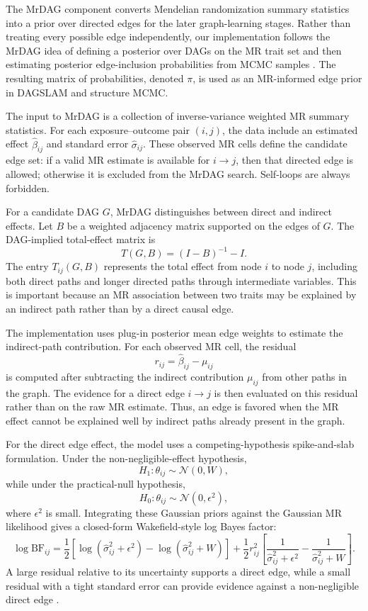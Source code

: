 \documentclass[11pt]{article}
\begin{document}
The MrDAG component converts Mendelian randomization summary statistics into a prior over directed edges for the later graph-learning stages. Rather than treating every possible edge independently, our implementation follows the MrDAG idea of defining a posterior over DAGs on the MR trait set and then estimating posterior edge-inclusion probabilities from MCMC samples \citep{Zuber2025}. The resulting matrix of probabilities, denoted $\pi$, is used as an MR-informed edge prior in DAGSLAM and structure MCMC.

The input to MrDAG is a collection of inverse-variance weighted MR summary statistics. For each exposure--outcome pair $(i,j)$, the data include an estimated effect $\hat{\beta}_{ij}$ and standard error $\hat{\sigma}_{ij}$. These observed MR cells define the candidate edge set: if a valid MR estimate is available for $i \to j$, then that directed edge is allowed; otherwise it is excluded from the MrDAG search. Self-loops are always forbidden.

For a candidate DAG $G$, MrDAG distinguishes between direct and indirect effects. Let $B$ be a weighted adjacency matrix supported on the edges of $G$. The DAG-implied total-effect matrix is
\[
T(G,B) = (I - B)^{-1} - I.
\]
The entry $T_{ij}(G,B)$ represents the total effect from node $i$ to node $j$, including both direct paths and longer directed paths through intermediate variables. This is important because an MR association between two traits may be explained by an indirect path rather than by a direct causal edge.

The implementation uses plug-in posterior mean edge weights to estimate the indirect-path contribution. For each observed MR cell, the residual
\[
r_{ij} = \hat{\beta}_{ij} - \mu_{ij}
\]
is computed after subtracting the indirect contribution $\mu_{ij}$ from other paths in the graph. The evidence for a direct edge $i \to j$ is then evaluated on this residual rather than on the raw MR estimate. Thus, an edge is favored when the MR effect cannot be explained well by
indirect paths already present in the graph.

For the direct edge effect, the model uses a competing-hypothesis spike-and-slab formulation. Under the non-negligible-effect hypothesis,
\[
H_1: \theta_{ij} \sim \mathcal{N}(0,W),
\]
while under the practical-null hypothesis,
\[
H_0: \theta_{ij} \sim \mathcal{N}(0,\epsilon^2),
\]
where $\epsilon^2$ is small. Integrating these Gaussian priors against the Gaussian MR likelihood gives a closed-form Wakefield-style log Bayes factor:
\[
\log \mathrm{BF}_{ij}
=
\frac{1}{2}
\left[
\log(\hat{\sigma}_{ij}^2 + \epsilon^2)
-
\log(\hat{\sigma}_{ij}^2 + W)
\right]
+
\frac{1}{2}r_{ij}^2
\left[
\frac{1}{\hat{\sigma}_{ij}^2 + \epsilon^2}
-
\frac{1}{\hat{\sigma}_{ij}^2 + W}
\right].
\]
A large residual relative to its uncertainty supports a direct edge, while a small residual with a tight standard error can provide evidence against a non-negligible direct edge \citep{Wakefield2009}.
\end{document}
